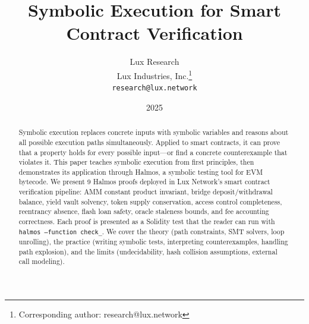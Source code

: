 \documentclass[11pt,a4paper]{article}
\title{Symbolic Execution for Smart Contract Verification}
\author{
Lux Research \\
Lux Industries, Inc.\thanks{Corresponding author: research@lux.network}\\
\texttt{research@lux.network}
}
\date{2025}
\begin{document}
\luxcoverpage

\begin{abstract}
Symbolic execution replaces concrete inputs with symbolic variables and reasons about all
possible execution paths simultaneously. Applied to smart contracts, it can prove that a
property holds for every possible input---or find a concrete counterexample that violates
it. This paper teaches symbolic execution from first principles, then demonstrates its
application through Halmos, a symbolic testing tool for EVM bytecode. We present 9
Halmos proofs deployed in Lux Network's smart contract verification pipeline: AMM constant
product invariant, bridge deposit/withdrawal balance, yield vault solvency, token supply
conservation, access control completeness, reentrancy absence, flash loan safety, oracle
staleness bounds, and fee accounting correctness. Each proof is presented as a Solidity
test that the reader can run with \texttt{halmos --function check\_}. We cover the
theory (path constraints, SMT solvers, loop unrolling), the practice (writing symbolic
tests, interpreting counterexamples, handling path explosion), and the limits (undecidability,
hash collision assumptions, external call modeling).
\end{abstract}

\tableofcontents
\newpage












\end{document}

